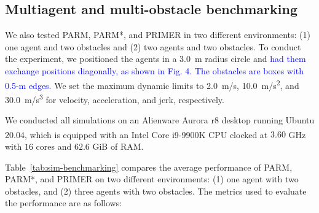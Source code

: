 \begin{table}[h]
\renewcommand{\arraystretch}{1.4}
\caption{\centering PRIMER vs. PARM* in single-agent, single-obstacle environment}
\label{tab:sim-compare-primer-parm_star}
\begin{centering}
\par\end{centering}
\end{table}

\subsection{Multiagent and multi-obstacle benchmarking}

We also tested PARM, PARM*, and PRIMER in two different environments: (1) one agent and two obstacles and (2) two agents and two obstacles. To conduct the experiment, we positioned the agents in a \SI{3.0}{\m} radius circle and \textcolor{blue}{had them exchange positions diagonally, as shown in Fig. 4. The obstacles are boxes with 0.5-m edges.} We set the maximum dynamic limits to \SI{2.0}{\m/\s}, \SI{10.0}{\m/\s^2}, and \SI{30.0}{\m/\s^3} for velocity, acceleration, and jerk, respectively.

We conducted all simulations on an Alienware Aurora r8 desktop running Ubuntu 20.04, which is equipped with an Intel\textsuperscript{\textregistered} Core\textsuperscript{\texttrademark} i9-9900K CPU clocked at $3.60$ GHz with $16$ cores and $62.6$ GiB of RAM.

Table~\ref{tab:sim-benchmarking} compares the average performance of PARM, PARM*, and PRIMER on two different environments: (1) one agent with two obstacles, and (2) three agents with two obstacles. The metrics used to evaluate the performance are as follows:

